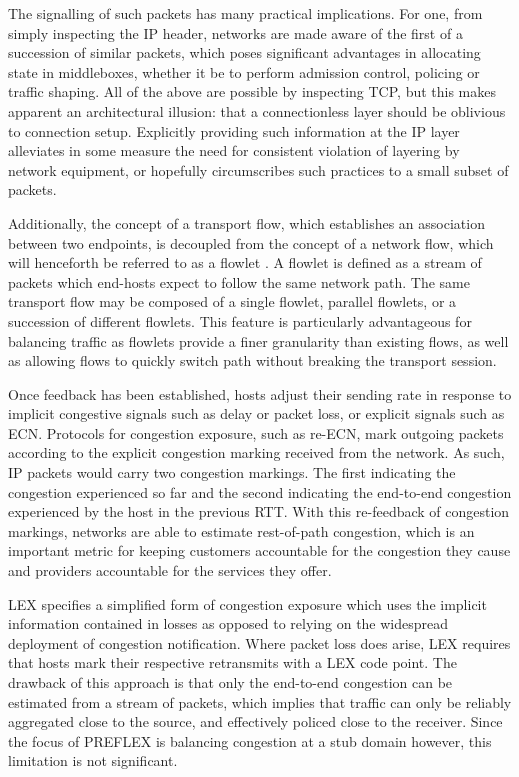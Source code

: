 The signalling of such packets has many practical implications. 
For one, from simply inspecting the \ac{IP} header, networks are made aware of the first of a succession of similar packets, which poses significant advantages in allocating state in middleboxes, whether it be to perform admission control, policing or traffic shaping. 
All of the above are possible by inspecting \ac{TCP}, but this makes apparent an architectural illusion: that a connectionless layer should be oblivious to connection setup. 
Explicitly providing such information at the \ac{IP} layer alleviates in some measure the need for consistent violation of layering by network equipment, or hopefully circumscribes such practices to a small subset of packets.

Additionally, the concept of a transport flow, which establishes an association between two endpoints, is decoupled from the concept of a network flow, which will henceforth be referred to as a flowlet \cite{Sinha:2004p124}. 
A flowlet is defined as a stream of packets which end-hosts expect to follow the same network path. 
The same transport flow may be composed of a single flowlet, parallel flowlets, or a succession of different flowlets. 
This feature is particularly advantageous for balancing traffic as flowlets provide a finer granularity than existing flows, as well as allowing flows to quickly switch path without breaking the transport session.

Once feedback has been established, hosts adjust their sending rate in response to implicit congestive signals such as delay or packet loss, or explicit signals such as \ac{ECN}. Protocols for congestion exposure, such as re-\ac{ECN}, mark outgoing packets according to the explicit congestion marking received from the network. As such, \ac{IP} packets would carry two congestion markings. The first indicating the congestion experienced so far and the second indicating the end-to-end congestion experienced by the host in the previous \ac{RTT}. With this re-feedback of congestion markings, networks are able to estimate rest-of-path congestion, which is an important metric for keeping customers accountable for the congestion they cause and providers accountable for the services they offer.

\ac{LEX} specifies a simplified form of congestion exposure which uses the implicit information contained in losses as opposed to relying on the widespread deployment of congestion notification. Where packet loss does arise, \ac{LEX} requires that hosts mark their respective retransmits with a \ac{LEX} code point. The drawback of this approach is that only the end-to-end congestion can be estimated from a stream of packets, which implies that traffic can only be reliably aggregated close to the source, and effectively policed close to the receiver. Since the focus of \ac{PREFLEX} is balancing congestion at a stub domain however, this limitation is not significant.

